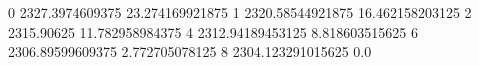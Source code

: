 0 2327.3974609375 23.274169921875
1 2320.58544921875 16.462158203125
2 2315.90625 11.782958984375
4 2312.94189453125 8.818603515625
6 2306.89599609375 2.772705078125
8 2304.123291015625 0.0

